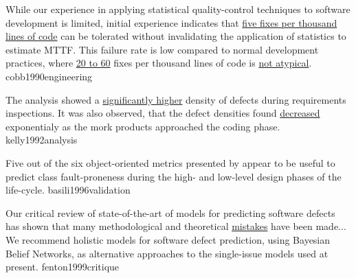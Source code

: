 \documentclass{article}
\begin{document}
  {While our experience in applying statistical quality-control techniques to software development is limited, initial experience indicates that \ul{five fixes per thousand lines of code} can be tolerated without invalidating the application of statistics to estimate MTTF. This failure rate is low compared to normal development practices, where \ul{20 to 60} fixes per thousand lines of code is \ul{not atypical}.}
  {cobb1990engineering}

  {The analysis showed a \ul{significantly higher} density of defects during requirements inspections. It was also observed, that the defect densities found \ul{decreased} exponentialy as the mork products approached the coding phase.}
  {kelly1992analysis}

  {Five out of the six object-oriented metrics presented by \citet{chidamber1994metrics} appear to be useful to predict class fault-proneness during the high- and low-level design phases of the life-cycle.}
  {basili1996validation}

  {Our critical review of state-of-the-art of models for predicting software defects has shown that many methodological and theoretical \ul{mistakes} have been made... We recommend holistic models for software defect prediction, using Bayesian Belief Networks, as alternative approaches to the single-issue models used at present.}
  {fenton1999critique}

\end{document}
